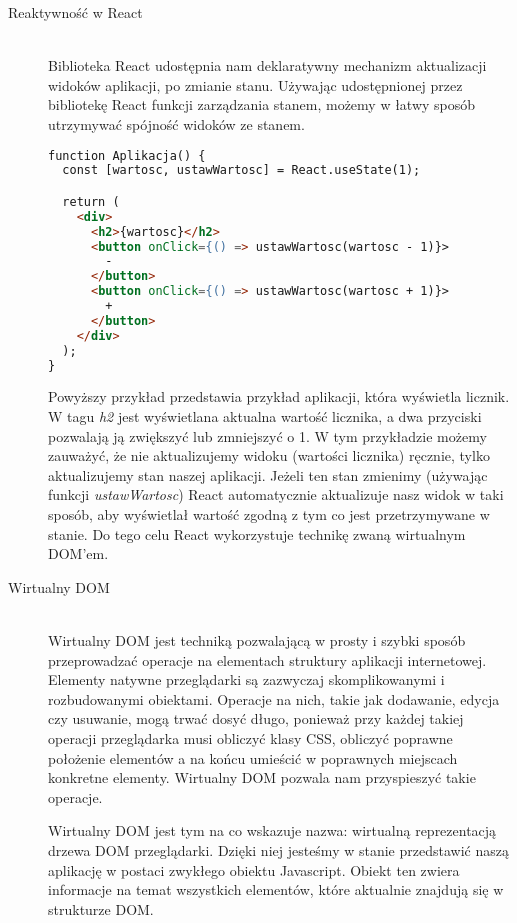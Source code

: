 \begin{description}
 \item[Reaktywność w React] \hfill \\ Biblioteka React udostępnia nam deklaratywny mechanizm aktualizacji widoków aplikacji, po zmianie stanu. Używając udostępnionej przez bibliotekę React funkcji zarządzania stanem, możemy w łatwy sposób utrzymywać spójność widoków ze stanem.

\begin{lstlisting}[language=HTML, caption=Użycie mechanizmu zarządzania stanem w React, label={lst:reactCounterCode}]
function Aplikacja() {
  const [wartosc, ustawWartosc] = React.useState(1);

  return (
    <div>
      <h2>{wartosc}</h2>
      <button onClick={() => ustawWartosc(wartosc - 1)}>
        -
      </button>
      <button onClick={() => ustawWartosc(wartosc + 1)}>
        +
      </button>
    </div>
  );
}
\end{lstlisting}

Powyższy przykład przedstawia przykład aplikacji, która wyświetla licznik. W tagu \emph{h2} jest wyświetlana aktualna wartość licznika, a dwa przyciski pozwalają ją zwiększyć lub zmniejszyć o 1. W tym przykładzie możemy zauważyć, że nie aktualizujemy widoku (wartości licznika) ręcznie, tylko aktualizujemy stan naszej aplikacji. Jeżeli ten stan zmienimy (używając funkcji \emph{ustawWartosc}) React automatycznie aktualizuje nasz widok w taki sposób, aby wyświetlał wartość zgodną z tym co jest przetrzymywane w stanie. Do tego celu React wykorzystuje technikę zwaną wirtualnym DOM'em.

  \item[Wirtualny DOM] \hfill \\ Wirtualny DOM jest techniką pozwalającą w prosty i szybki sposób przeprowadzać operacje na elementach struktury aplikacji internetowej. Elementy natywne przeglądarki są zazwyczaj skomplikowanymi i rozbudowanymi obiektami. Operacje na nich, takie jak dodawanie, edycja czy usuwanie, mogą trwać dosyć długo, ponieważ przy każdej takiej operacji przeglądarka musi obliczyć klasy CSS, obliczyć poprawne położenie elementów a na końcu umieścić w poprawnych miejscach konkretne elementy. Wirtualny DOM pozwala nam przyspieszyć takie operacje.

  Wirtualny DOM jest tym na co wskazuje nazwa: wirtualną reprezentacją drzewa DOM przeglądarki. Dzięki niej jesteśmy w stanie przedstawić naszą aplikację w postaci zwykłego obiektu Javascript. Obiekt ten zwiera informacje na temat wszystkich elementów, które aktualnie znajdują się w strukturze DOM. 


\end{description}

